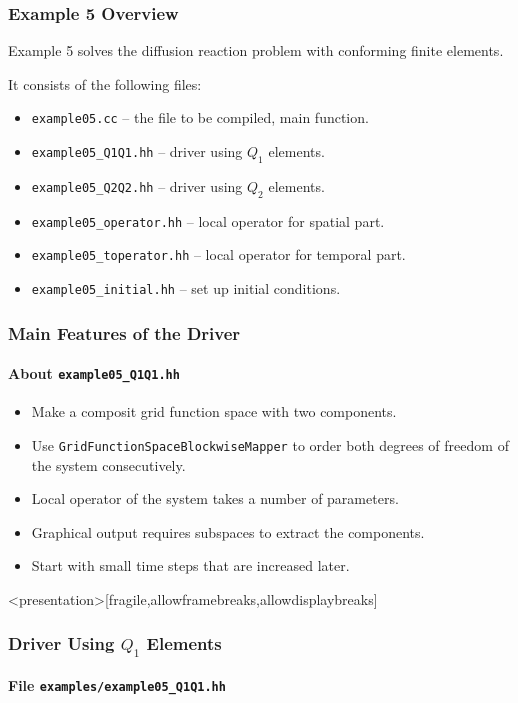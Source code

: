 \begin{frame}
\frametitle{Example 5 Overview}
Example 5 solves the diffusion reaction problem with conforming finite elements.

It consists of the following files:
\begin{itemize}
\item \lstinline{example05.cc} -- the file to be compiled, main function. 
\item \lstinline{example05_Q1Q1.hh} -- driver using $Q_1$ elements. 
\item \lstinline{example05_Q2Q2.hh} -- driver using $Q_2$ elements.
\item \lstinline{example05_operator.hh} -- local operator for spatial part.
\item \lstinline{example05_toperator.hh} -- local operator for temporal part.
\item \lstinline{example05_initial.hh} -- set up initial conditions.
\end{itemize}
\end{frame}

\begin{frame}
\frametitle{Main Features of the Driver}
\framesubtitle{About \lstinline{example05_Q1Q1.hh}}
\begin{itemize}
\item Make a composit grid function space with two components.
\item Use \lstinline{GridFunctionSpaceBlockwiseMapper} to order 
both degrees of freedom of the system consecutively.
\item Local operator of the system takes a number of parameters.
\item Graphical output requires subspaces to extract the components.
\item Start with small time steps that are increased later.
\end{itemize}
\end{frame}

\begin{frame}<presentation>[fragile,allowframebreaks,allowdisplaybreaks]
\frametitle<presentation>{Driver Using $Q_1$ Elements}
\framesubtitle<presentation>{File \texttt{examples/example05\_Q1Q1.hh}}

\end{frame}

